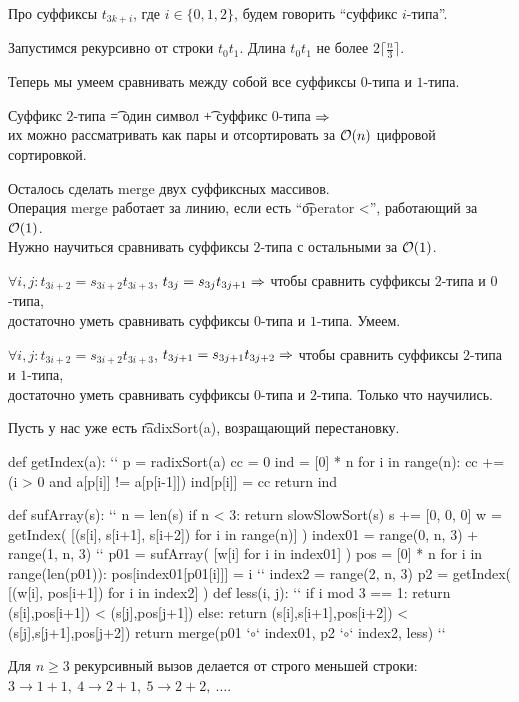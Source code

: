 \down
Про суффиксы $t_{3k+i}$, где $i \in \{0, 1, 2\}$, будем говорить ``суффикс $i$-типа''.

\down
Запустимся рекурсивно от строки $t_0t_1$. Длина $t_0t_1$ не более $2\lceil\frac{n}{3}\rceil$. 

Теперь мы умеем сравнивать между собой все суффиксы $0$-типа и $1$-типа.

\down
Суффикс $2$-типа \t{=} один символ \t{+} суффикс $0$-типа $\Rightarrow$ \\
их можно рассматривать как пары и отсортировать за $\mathcal{O}(n)$ цифровой сортировкой.

\down
Осталось сделать merge двух суффиксных массивов. \\
Операция merge работает за линию, если есть ``\t{operator <}'', работающий за $\mathcal{O}(1)$.\\
Нужно научиться сравнивать суффиксы $2$-типа с остальными за $\mathcal{O}(1)$.

\down
$\forall i, j \colon t_{3i+2} = s_{3i+2}t_{3i+3}$, $t_{3j} = s_{3j}t_{3j+1} \Rightarrow$ чтобы сравнить суффиксы 
$2$-типа и $0$-типа, \\
достаточно уметь сравнивать суффиксы $0$-типа и $1$-типа. Умеем.

\down
$\forall i, j \colon t_{3i+2} = s_{3i+2}t_{3i+3}$, $t_{3j+1} = s_{3j+1}t_{3j+2} \Rightarrow$ чтобы сравнить суффиксы 
$2$-типа и $1$-типа, \\
достаточно уметь сравнивать суффиксы $0$-типа и $2$-типа. Только что научились.


\pagebreak
\vspace*{-1.8em}

Пусть у нас уже есть \t{radixSort(a)}, возращающий перестановку.
\begin{codep}
def getIndex(a): ``
	p = radixSort(a)
	cc = 0
	ind = [0] * n
	for i in range(n):
		cc += (i > 0 and a[p[i]] != a[p[i-1]])
		ind[p[i]] = cc
	return ind

def sufArray(s): ``
	n = len(s)
	if n < 3: return slowSlowSort(s)
	s += [0, 0, 0]
	w = getIndex( [(s[i], s[i+1], s[i+2]) for i in range(n)] )
	index01 = range(0, n, 3) + range(1, n, 3) ``
	p01 = sufArray( [w[i] for i in index01] )
	pos = [0] * n
	for i in range(len(p01)): pos[index01[p01[i]]] = i ``
	index2 = range(2, n, 3)
	p2 = getIndex( [(w[i], pos[i+1]) for i in index2] )
	def less(i, j): ``
		if i mod 3 == 1: return (s[i],pos[i+1]) < (s[j],pos[j+1])
		else: return (s[i],s[i+1],pos[i+2]) < (s[j],s[j+1],pos[j+2])
	return merge(p01 `$\circ$` index01, p2 `$\circ$` index2, less) ``
\end{codep}
Для $n \ge 3$ рекурсивный вызов делается от строго меньшей строки: \\
$3 \to 1{+}1,\ 4 \to 2{+}1,\ 5 \to 2{+}2,\ \dots$. 

